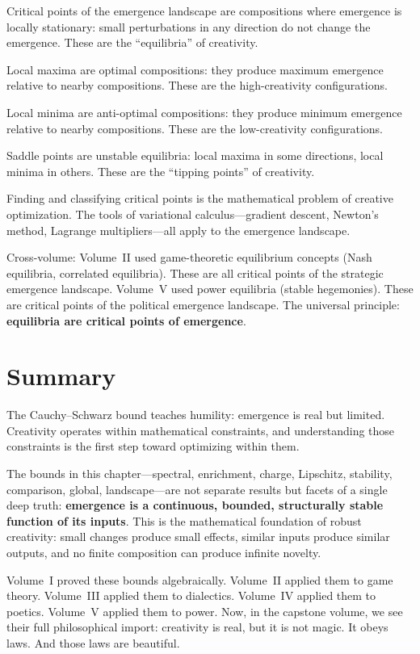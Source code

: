 \begin{interpretation}
Critical points of the emergence landscape are compositions where emergence
is locally stationary: small perturbations in any direction do not change the
emergence. These are the ``equilibria'' of creativity.

Local maxima are optimal compositions: they produce maximum emergence relative
to nearby compositions. These are the high-creativity configurations.

Local minima are anti-optimal compositions: they produce minimum emergence
relative to nearby compositions. These are the low-creativity configurations.

Saddle points are unstable equilibria: local maxima in some directions, local
minima in others. These are the ``tipping points'' of creativity.

Finding and classifying critical points is the mathematical problem of creative
optimization. The tools of variational calculus---gradient descent, Newton's
method, Lagrange multipliers---all apply to the emergence landscape.

Cross-volume: Volume~II used game-theoretic equilibrium concepts (Nash
equilibria, correlated equilibria). These are all critical points of the
strategic emergence landscape. Volume~V used power equilibria (stable
hegemonies). These are critical points of the political emergence landscape.
The universal principle: \textbf{equilibria are critical points of emergence}.
\end{interpretation}

\section{Summary}

The Cauchy--Schwarz bound teaches humility: emergence is real but limited.
Creativity operates within mathematical constraints, and understanding those
constraints is the first step toward optimizing within them.

The bounds in this chapter---spectral, enrichment, charge, Lipschitz,
stability, comparison, global, landscape---are not separate results but facets
of a single deep truth: \textbf{emergence is a continuous, bounded, structurally
stable function of its inputs}. This is the mathematical foundation of robust
creativity: small changes produce small effects, similar inputs produce
similar outputs, and no finite composition can produce infinite novelty.

Volume~I proved these bounds algebraically. Volume~II applied them to game
theory. Volume~III applied them to dialectics. Volume~IV applied them to
poetics. Volume~V applied them to power. Now, in the capstone volume, we see
their full philosophical import: creativity is real, but it is not magic. It
obeys laws. And those laws are beautiful.



